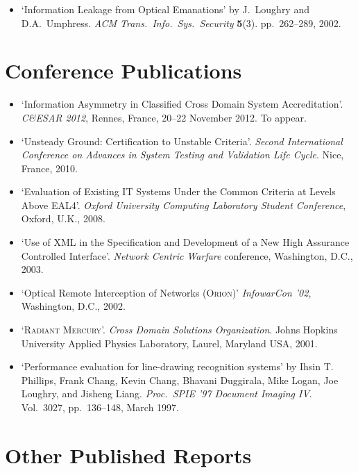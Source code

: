 \documentclass[letterpaper]{article}
\begin{document}
\begin{itemize}
    \item `Information Leakage from Optical Emanations' by J.\ Loughry
    and D.A.\ Umphress. \emph{ACM Trans.\ Info.\ Sys.\ Security} \textbf{5}(3).
    pp.\ 262--289, 2002.
\end{itemize}

\section*{Conference Publications} %

\begin{itemize}
	\item `Information Asymmetry in Classified Cross Domain System Accreditation'.
		\emph{C\&ESAR 2012}, Rennes, France, 20--22 November 2012.  To appear.

	\item `Unsteady Ground: Certification to Unstable Criteria'.
		\emph{Second International Conference on Advances in System Testing
		and Validation Life Cycle}. Nice, France, 2010. 

	\item `Evaluation of Existing IT Systems Under the Common Criteria
		at Levels Above EAL4'. \emph{Oxford University
		Computing Laboratory Student Conference}, Oxford, U.K., 2008.

    \item `Use of XML in the Specification and Development of a New High
		Assurance Controlled Interface'. \emph{Network Centric Warfare} conference,
		Washington, D.C., 2003.

    \item `Optical Remote Interception of Networks (\textsc{Orion})'
		\emph{InfowarCon '02}, Washington, D.C., 2002.

    \item `\textsc{Radiant Mercury}'. \emph{Cross Domain Solutions
		Organization}. Johns Hopkins University Applied Physics Laboratory,
		Laurel, Maryland USA, 2001.

    \item `Performance evaluation for line-drawing recognition systems'
		by Ihsin T. Phillips, Frank Chang, Kevin Chang, Bhavani Duggirala,
		Mike Logan, Joe Loughry, and Jisheng Liang. \emph{Proc.\ SPIE '97
		Document Imaging IV}. Vol.\ 3027, pp.\ 136--148, March 1997.
\end{itemize}

\section*{Other Published Reports} %
\end{document}

